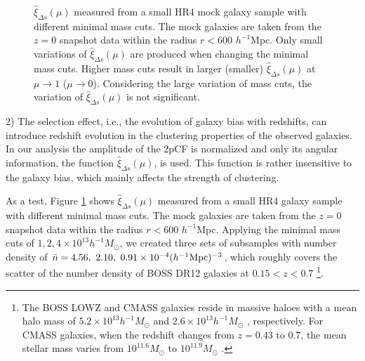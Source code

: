 \documentclass[iop]{emulateapj}
\begin{document}
\begin{figure}
   \caption{
    \label{fig_2pcf_masscut} 
    $\hat \xi_{\Delta s}(\mu)$ measured from a small HR4 mock galaxy sample with different minimal mass cuts.
    The mock galaxies are taken from the $z=0$ snapshot data within the radius $r<600$ $h^{-1}$Mpc.
    Only small variations of $\hat\xi_{\Delta s}(\mu)$ are produced when changing the minimal mass cuts.
    Higher mass cuts result in larger (smaller) $\hat\xi_{\Delta s}(\mu)$ at $\mu\rightarrow1$ ($\mu\rightarrow0$).
    Considering the large variation of mass cuts, the variation of $\hat\xi_{\Delta s}(\mu)$ is not significant.
   }
\end{figure}

2) The selection effect, i.e., the evolution of galaxy bias with redshifts, 
can introduce redshift evolution in the clustering properties of the observed galaxies.
In our analysis the amplitude of the 2pCF is normalized and only its angular information, 
the function $\hat \xi_{\Delta s}(\mu)$, is used.
This function is rather insensitive to the galaxy bias,
which mainly affects the strength of clustering.

As a test, Figure \ref{fig_2pcf_masscut} shows $\hat \xi_{\Delta s}(\mu)$ measured from a small HR4 galaxy sample with different minimal mass cuts.
The mock galaxies are taken from the $z=0$ snapshot data within the radius $r<600$ $h^{-1}$Mpc.
Applying the minimal mass cuts of $1,2,4\times 10^{13} h^{-1} M_{\odot}$, 
we created three sets of subsamples with number density of 
$\bar n=4.56,\ 2.10,\ 0.91 \times 10^{-4} ( h^{-1} \rm Mpc)^{-3}$, 
which roughly covers the scatter of the number density of BOSS DR12 galaxies at $0.15<z<0.7$
\footnote{The BOSS LOWZ and CMASS galaxies reside in massive haloes 
with a mean halo mass of $5.2 \times 10^{13} h^{-1} M_{\odot}$ and $2.6 \times 10^{13} h^{-1} M_{\odot}$ \citep{Parejko2013,White2011,Reidetal:2016},
respectively.
For CMASS galaxies, when the redshift changes from $z=0.43$ to $0.7$,
the mean stellar mass varies from $10^{11.6} {M_{\odot}}$ to $10^{11.9} {M_{\odot}}$ \citep{CMASSLSS2014}.}.
\end{document}
